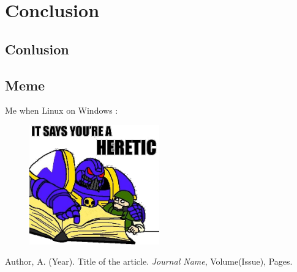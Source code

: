 \documentclass{article}
\begin{document}
	\newpage
	\section{Conclusion}
	\subsection{Conlusion}

	\subsection{Meme}
		\begin{center}Me when Linux on Windows :
	\end{center}
	\begin{figure}[h]
		\centering
		\includegraphics[width=0.5\textwidth]{meme.png}
		
		\label{fig:your_label}
	\end{figure}
		\newpage

	\begin{thebibliography}{9}
		Author, A. (Year). Title of the article. \textit{Journal Name}, Volume(Issue), Pages.
	\end{thebibliography}
\end{document}
